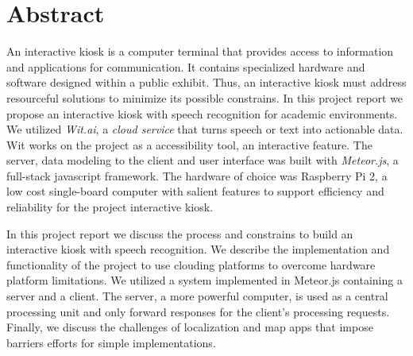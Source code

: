 %
\chapter*{Abstract}
\label{sec:abstract}
\vspace*{-10mm}


An interactive kiosk is a computer terminal that provides access to information and applications for communication.
It contains specialized hardware and software designed within a public exhibit.
Thus, an interactive kiosk must address resourceful solutions to minimize its possible constrains.
In this project report we propose an interactive kiosk with speech recognition for academic environments.
We utilized \emph{Wit.ai}, a \emph{cloud service} that turns speech or text into actionable data.
Wit works on the project as a accessibility tool, an interactive feature.
The server, data modeling to the client and user interface was built with \emph{Meteor.js}, a full-stack javascript framework.
The hardware of choice was Raspberry Pi 2, a low cost single-board computer with salient features to support efficiency and reliability for the project interactive kiosk.

In this project report we discuss the process and constrains to build an interactive kiosk with speech recognition.
We describe the implementation and functionality of the project to use clouding platforms to overcome hardware platform limitations.
We utilized a system implemented in Meteor.js containing a server and a client.
The server, a more powerful computer, is used as a central processing unit and only forward responses for the client's processing requests.
Finally, we discuss the challenges of localization and map apps that impose barriers efforts for simple implementations.